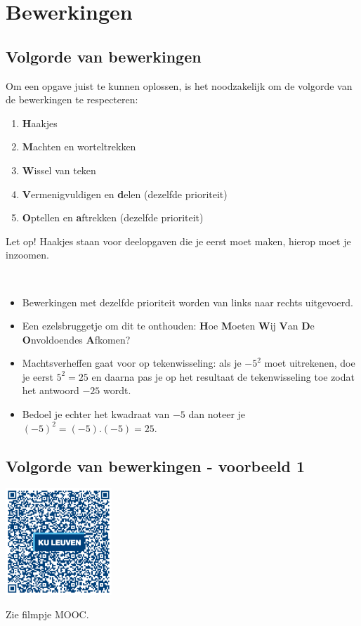 \section{Bewerkingen}

\subsection{Volgorde van bewerkingen}
Om een opgave juist te kunnen oplossen, is het noodzakelijk om de volgorde van de bewerkingen te respecteren:

\begin{enumerate}
	\item \textbf{H}aakjes
	\item \textbf{M}achten en worteltrekken
	\item \textbf{W}issel van teken
	\item \textbf{V}ermenigvuldigen en \textbf{d}elen (dezelfde prioriteit)
	\item \textbf{O}ptellen en \textbf{a}ftrekken (dezelfde prioriteit)
\end{enumerate}


Let op! Haakjes staan voor deelopgaven die je eerst moet maken, hierop moet je inzoomen.


\begin{opmerking}
	\ \\
	\begin{itemize}
	\item Bewerkingen met dezelfde prioriteit worden van links naar rechts uitgevoerd.
	\item Een ezelsbruggetje om dit te onthouden: \textbf{H}oe \textbf{M}oeten \textbf{W}ij \textbf{V}an \textbf{D}e \textbf{O}nvoldoendes \textbf{A}fkomen?
	\item Machtsverheffen gaat voor op tekenwisseling: als je $-5^2$ moet uitrekenen, doe je eerst $5^2=25$ en daarna pas je op het resultaat de tekenwisseling toe zodat het antwoord $-25$ wordt.
	\item Bedoel je echter het kwadraat van $-5$ dan noteer je $(-5)^2=(-5).(-5)=25$.
\end{itemize}
\end{opmerking}

\subsection{Volgorde van bewerkingen - voorbeeld 1}
\begin{minipage}{.25\linewidth}
	\raggedright
	\includegraphics[width=4cm]{1_elem_rekenvaardigheden_A/inputs/QR_Code_VOLGORDE1_module1new}
\end{minipage}
\begin{minipage}{.7\linewidth}
	Zie filmpje MOOC.
\end{minipage}

